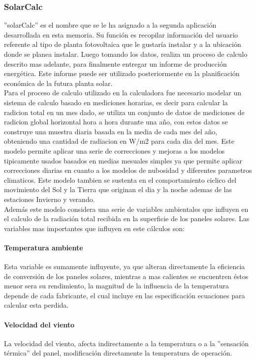 \subsubsection{SolarCalc}
''solarCalc'' es el nombre que se le ha asignado a la segunda aplicación desarrollada en esta memoria. Su función es recopilar información del usuario referente al tipo de planta fotovoltaica que le gustaría instalar y a la ubicación donde se planea instalar. Luego tomando los datos, realiza un proceso de calculo descrito mas adelante, para finalmente entregar un informe de producción energética. Este informe puede ser utilizado posteriormente en la planificación económica de la futura planta solar.\\

Para el proceso de calculo utilizado en la calculadora fue necesario modelar un sistema de calculo basado en mediciones horarias, es decir para calcular la radicion total en un mes dado, se utiliza un conjunto de datos de mediciones de radicion global horizontal hora a hora durante una año, con estos datos se construye una muestra diaria basada en la media de cada mes del año, obteniendo una cantidad de radiacion en W/m2 para cada dia del mes. Este modelo permite aplicar una serie de correcciones y mejoras a los modelos tipicamente usados basados en medias mesuales simples ya que permite aplicar correcciones diarias en cuanto a los modelos de nubosidad y diferentes parametros climaticos. Este modelo tambien se sustenta en el comportamiento ciclico del movimiento del Sol y la Tierra que originan el dia y la noche ademas de las estaciones Invierno y verando.\\
Además este modelo considera una serie de variables ambientales que influyen en el calculo de la radiación total recibida en la superficie de los paneles solares. Las variables mas importantes que influyen en este cálculos son:\\

\paragraph{Temperatura ambiente}
Esta variable es sumamente influyente, ya que alteran directamente la eficiencia de conversión de los paneles solares, mientras a mas calientes se encuentren éstos menor sera su rendimiento, la magnitud de la influencia de la temperatura depende de cada fabricante, el cual incluye en las especificación ecuaciones para calcular esta perdida.

\paragraph{Velocidad del viento}
La velocidad del viento, afecta indirectamente a la temperatura o a la ''sensación térmica'' del panel, modificación directamente la temperatura de operación.

